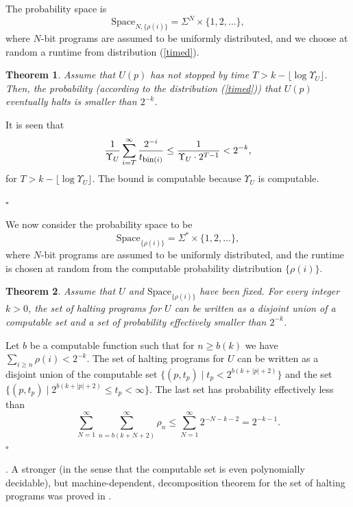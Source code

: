 \documentclass[12pt,twoside,openright]{report}
\newtheorem{thm}{Theorem}
\newcommand{\QED}{\hfill $\square$}
\newcommand{\fbin}{\mbox{\rm \footnotesize{bin}}}
\newcommand{\myproof}{\noindent {\em Proof.}  }
\newcommand{\Space}{\mbox{Space}}
\begin{document}
The probability space is 
\[\Space_{N, \{\rho(i)\}} = \Sigma^{N} \times \{1,2,\ldots \},\]
\noindent where $N$-bit programs are assumed to be uniformly distributed, and we choose at random a runtime from distribution (\ref{timed}).

\medskip


\begin{thm}
Assume that $U(p)$ has not stopped by time $T> k - \lfloor \log \Upsilon_{U} \rfloor$. Then, the probability (according to the distribution (\ref{timed})) that $U(p)$ eventually halts is smaller than $2^{-k}$.
\end{thm}

\myproof It is seen that 
\[     \frac{1}{\Upsilon_{U}} \sum_{i=T}^{\infty} \frac{2^{-i}}{t_{\fbin(i)}} 
   \le \frac{1}{\Upsilon_{U} \cdot 2^{T-1}} < 2^{-k},\]
for $T> k - \lfloor \log \Upsilon_{U} \rfloor$. The bound is computable because $\Upsilon_{U}$ is computable.

\QED


We now consider the probability space to be 
\[\Space_{\{\rho(i)\}} = \Sigma^{*} \times \{1,2,\ldots \},\]
\noindent where $N$-bit programs  are assumed to be uniformly distributed, and the runtime is chosen at random from the computable probability distribution  $\{\rho(i)\}$. 

\medskip


\begin{thm}
Assume that $U$ and $\Space_{\{\rho(i)\}}$ have been fixed.  For every integer $k >0$, the set of halting programs for $U$ can be written as  a disjoint union of a computable set and a set of probability effectively smaller than  $2^{-k}$.
\end{thm}

\myproof Let $b$ be a computable function such that for $n\ge b(k)$ we have  $\sum_{i\ge n} \rho(i) < 2^{-k}$.  The set of halting programs for $U$ can be written as  a disjoint union of the computable set $\{(p,t_{p}) \mid t_{p} < 2^{b(k+|p|+2)}\}$ and the set $\{(p,t_{p}) \mid 2^{b(k+|p|+2)} \le t_{p}  < \infty \}$. The last set has probability effectively less than 
\[      \sum_{N=1}^{\infty} \sum_{n=b(k+N+2)}^{\infty} \rho_{n}
    \le \sum_{N=1}^{\infty} 2^{-N-k-2} = 2^{-k-1}.\]
\QED

\medskip

. A stronger (in the sense that the computable set is even polynomially decidable), but machine-dependent, decomposition theorem for the set of halting programs was proved in \cite{HM}.
\end{document}
